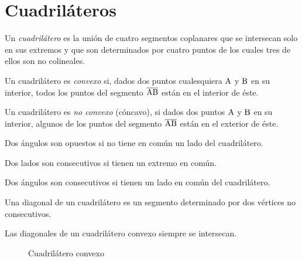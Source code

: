 \clearpage
\section{Cuadriláteros}

\begin{definition}
Un \textit{cuadrilátero} es la unión de cuatro segmentos coplanares que se intersecan solo en sus extremos y que son determinados por cuatro puntos de los cuales tres de ellos son no colineales.
\end{definition}

\begin{definition}
    Un cuadrilátero es \textit{convexo} si, dados dos puntos cualesquiera $\rm A$ y $\rm B$ en su interior, todos los puntos del segmento $\overline{\rm AB}$ están en el interior de éste.
\end{definition}

\begin{definition}
    Un cuadrilátero es \textit{no convexo} (cóncavo), si dados dos puntos $\rm A$ y $\rm B$ en su interior, algunos de los puntos del segmento $\overline{\rm AB}$ están en el exterior de éste.
\end{definition}

\begin{definition}
    Dos ángulos son opuestos si no tiene en común un lado del cuadrilátero.
\end{definition}

\begin{definition}
    Dos lados son consecutivos si tienen un extremo en común.
\end{definition}

\begin{definition}
    Dos ángulos son consecutivos si tienen un lado en común del cuadrilátero.
\end{definition}

\begin{definition}
    Una diagonal de un cuadrilátero es un segmento determinado por dos vértices no consecutivos.
\end{definition}

\begin{theorem}
    Las diagonales de un cuadrilátero convexo siempre se intersecan.

    \begin{figure}[!h]
        \centering
        
        \caption{Cuadrilátero convexo}
        \label{fig:theorem9}
    \end{figure}

\end{theorem}

